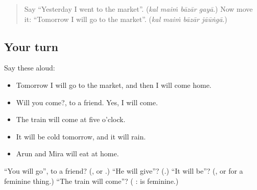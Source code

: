 \label{lesson:HI-R277-what-will-happen}



\begin{quote}
Say \textquotedblleft{}Yesterday I went to the market\textquotedblright{}. (\emph{kal maiṁ bāzār gayā}.) Now move it: \textquotedblleft{}Tomorrow I will go to the market\textquotedblright{}. (\emph{kal maiṁ bāzār jāūṅgā}.)
\end{quote}

\subsection*{Your turn}
Say these aloud:

\begin{itemize}
\raggedright
  \item Tomorrow I will go to the market, and then I will come home.
  \item Will you come?, to a friend. Yes, I will come.
  \item The train will come at five o'clock.
  \item It will be cold tomorrow, and it will rain.
  \item Arun and Mira will eat at home.
\end{itemize}

\begin{tcolorbox}[breakable,colback=teal!4,colframe=teal!35!black,title={Before you move on}]
\textquotedblleft{}You will go\textquotedblright{}, to a friend? (\textbf{}, or \textbf{}.) \textquotedblleft{}He will give\textquotedblright{}? (\textbf{}.) \textquotedblleft{}It will be\textquotedblright{}? (\textbf{}, or \textbf{} for a feminine thing.) \textquotedblleft{}The train will come\textquotedblright{}? (\textbf{ }: \textbf{} is feminine.)
\end{tcolorbox}
